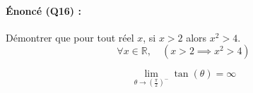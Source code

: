 \documentclass{article}
\begin{document}
\paragraph{Énoncé (Q16) :} Démontrer que pour tout réel $x$, si $x > 2$ alors $x^2 > 4$.
\begin{equation*}
    \forall x \in \mathbb{R}, \quad (x > 2 \implies x^2 > 4)
\end{equation*}

\begin{equation}
    \lim_{\theta \to \left(\frac{\pi}{2}\right)^-} \tan(\theta) = \infty
\end{equation}
\end{document}
